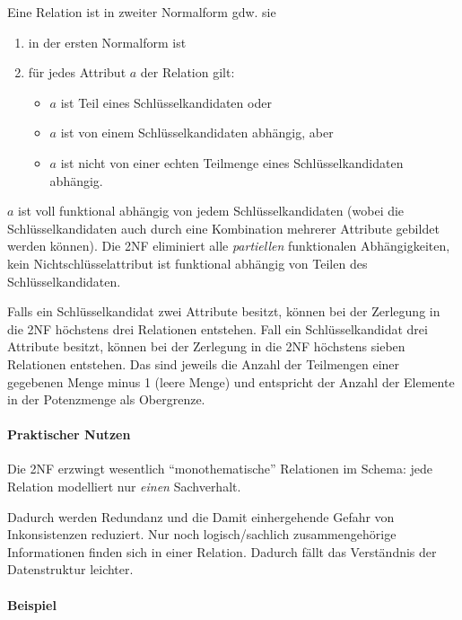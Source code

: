\documentclass{scrbook}
\begin{document}
\begin{definition}

Eine Relation ist in zweiter Normalform gdw. sie
\begin{enumerate}
\item in der ersten Normalform ist
\item für jedes Attribut $a$ der Relation gilt:
	\begin{itemize}
	\item $a$ ist Teil eines Schlüsselkandidaten oder
	\item $a$ ist von einem Schlüsselkandidaten abhängig, aber
	\item $a$ ist nicht von einer echten Teilmenge eines Schlüsselkandidaten abhängig.
	\end{itemize}
\end{enumerate}
\end{definition}

$a$ ist voll funktional abhängig von jedem Schlüsselkandidaten 
(wobei die Schlüsselkandidaten auch durch eine Kombination mehrerer Attribute
gebildet werden können).
Die 2NF eliminiert alle \emph{partiellen} funktionalen Abhängigkeiten,
kein Nichtschlüsselattribut ist funktional abhängig von Teilen des Schlüsselkandidaten.

Falls ein Schlüsselkandidat zwei Attribute besitzt, können bei der Zerlegung in
die 2NF höchstens drei Relationen entstehen.  Fall ein Schlüsselkandidat drei
Attribute besitzt, können bei der Zerlegung in die 2NF höchstens sieben
Relationen entstehen.  Das sind jeweils die Anzahl der Teilmengen einer
gegebenen Menge minus 1 (leere Menge) und entspricht der Anzahl der Elemente in
der Potenzmenge als Obergrenze.

\paragraph{Praktischer Nutzen}

Die 2NF erzwingt wesentlich \enquote{monothematische} Relationen im Schema:
jede Relation modelliert nur \emph{einen} Sachverhalt.

Dadurch werden Redundanz und die Damit einhergehende Gefahr von Inkonsistenzen reduziert.
Nur noch logisch/sachlich zusammengehörige Informationen finden sich in einer Relation.
Dadurch fällt das Verständnis der Datenstruktur leichter.


\paragraph{Beispiel}
\end{document}
